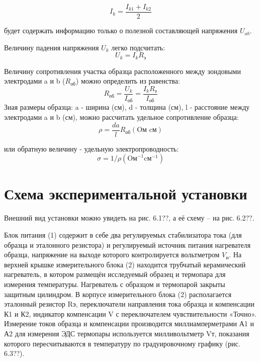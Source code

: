 $$I_k=\frac{I_{k1}+I_{k2}}{2}$$

будет содержать информацию только о полезной составляющей напряжения $U_{ab}$.

Величину падения напряжения $U_k$ легко подсчитать:
$$U_{k}=I_{k} R_{\text{э}}$$

Величину сопротивления участка образца расположенного между зондовыми электродами a и b ($R_{\text{об}}$) можно определить из равенства:
$$R_{\text{об}}=\frac{U_{k}}{I_{\text{об}}}=\frac{I_{k} R_{\text{э}}}{I_{\text{об}}}$$
Зная размеры образца: a - ширина (см), d - толщина (см), l - расстояние между электродами a и b (см), можно рассчитать удельное сопротивление образца:
$$\rho=\frac{d a}{l} R_{\text{об}} (\text{Oм} \text{ cм})$$

или обратную величину - удельную электропроводность: 
$$\sigma=1 / \rho\left(\text{Oм}^{-1} \text{cм}^{-1}\right)$$

\section{Схема экспериментальной установки}
Внешний вид установки можно увидеть на рис. 6.1??, а её схему – на рис. 6.2??. 


Блок питания (1) содержит в себе два регулируемых стабилизатора тока (для образца и эталонного резистора) и регулируемый
источник питания нагревателя образца, напряжение на выходе которого контролируется вольтметром $V_\text{н}$. На верхней
крышке измерительного блока (2) находится трубчатый керамический нагреватель, в котором размещён исследуемый образец и
термопара для измерения температуры. Нагреватель с образцом и термопарой закрыты защитным цилиндром. В корпусе
измерительного блока (2) располагается эталонный резистор Rэ, переключатели направления тока образца и компенсации К1 и
К2, индикатор компенсации V с переключателем чувствительности «Точно». Измерение токов образца и компенсации
производится миллиамперметрами А1 и А2 для измерения ЭДС термопары используется милливольтметр Vт, показания которого
пересчитываются в температуру по градуировочному графику (рис. 6.3??).



